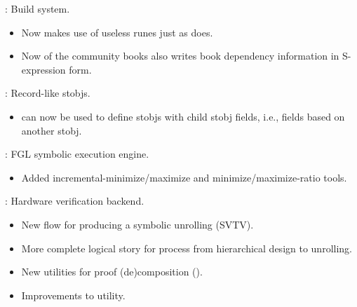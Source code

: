 
\begin{frame}

\implibtitle

:
Build system.
\begin{itemize}
\item Now  makes use of useless runes just as  does.
\item Now  of the community books also writes book dependency
      information in S-expression form.
\end{itemize}

\end{frame}


\begin{frame}

\implibtitle

:
Record-like stobjs.
\begin{itemize}
\item {} can now be used to define stobjs with child
      stobj fields, i.e., fields based on another stobj.
\end{itemize}

\end{frame}


\begin{frame}

\implibtitle

:
FGL symbolic execution engine.
\begin{itemize}
\item Added incremental-minimize/maximize and minimize/maximize-ratio tools.
\end{itemize}
\end{frame}


\begin{frame}

\implibtitle

:
Hardware verification backend.
\begin{itemize}
\item New flow for producing a symbolic unrolling (SVTV).
\item More complete logical story for process
      from hierarchical design to unrolling.
\item New utilities for proof (de)composition ().
\item Improvements to  utility.
\end{itemize}

\end{frame}

